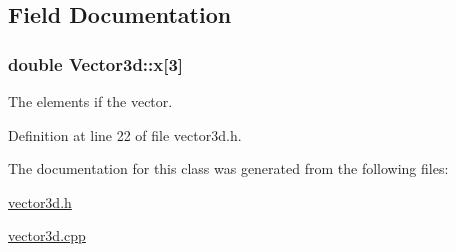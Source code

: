 \subsection{\-Field \-Documentation}
\hypertarget{classVector3d_ae5e82a2be7cc2e195e56875a5befe509}{
\subsubsection[{x}]{\setlength{\rightskip}{0pt plus 5cm}double {\bf \-Vector3d\-::x}\mbox{[}3\mbox{]}}}\label{df/dd0/classVector3d_ae5e82a2be7cc2e195e56875a5befe509}
\-The elements if the vector. 

\-Definition at line 22 of file vector3d.\-h.



\-The documentation for this class was generated from the following files\-:\begin{DoxyCompactItemize}
\item 
\hyperlink{vector3d_8h}{vector3d.\-h}\item 
\hyperlink{vector3d_8cpp}{vector3d.\-cpp}\end{DoxyCompactItemize}
